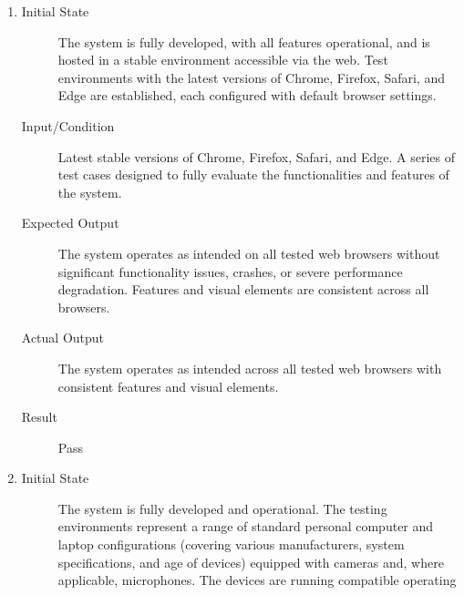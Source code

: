 \documentclass[12pt, titlepage]{article}
\begin{document}
\begin{enumerate}[NFR-T1]
  \item \label{NFRT17}
    \begin{description}
    \item[Initial State] The system is fully developed, with all features
      operational, and is hosted in a stable environment accessible via the web.
      Test environments with the latest versions of Chrome, Firefox, Safari, and
      Edge are established, each configured with default browser settings.
    \item[Input/Condition] Latest stable versions of Chrome, Firefox, Safari, and
      Edge. A series of test cases designed to fully evaluate the functionalities
      and features of the system.
    \item[Expected Output] The system operates as intended on all tested web
      browsers without significant functionality issues, crashes, or severe
      performance degradation. Features and visual elements are consistent across
      all browsers.
    \item[Actual Output] The system operates as intended across all tested web 
    browsers with consistent features and visual elements.
    \item[Result] Pass 
    \end{description}
  \item \label{NFRT18}
    \begin{description}
    \item[Initial State] The system is fully developed and operational. The
      testing environments represent a range of standard personal computer and
      laptop configurations (covering various manufacturers, system
      specifications, and age of devices) equipped with cameras and, where
      applicable, microphones. The devices are running compatible operating

\end{description}
\end{enumerate}
\end{document}
